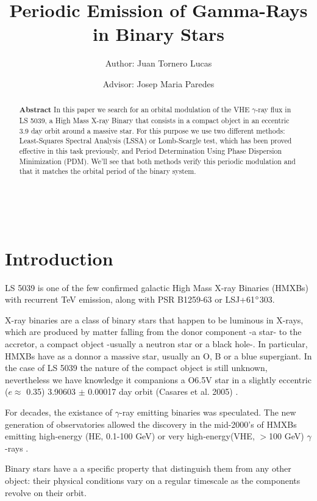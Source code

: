 \documentclass[twocolumn]{revtex4}
\begin{document}
\title{Periodic Emission of Gamma-Rays in Binary Stars}
\author{Author: Juan Tornero Lucas}\\
\author{Advisor: Josep Maria Paredes}
\begin{abstract}
\textbf{Abstract }In this paper we search for an orbital modulation of the VHE $\gamma$-ray flux in LS 5039, a High Mass X-ray Binary that consists in a compact object in an eccentric 3.9 day orbit around a massive star. For this purpose we use two different methods: Least-Squares Spectral Analysis (LSSA) or Lomb-Scargle test, which has been proved effective in this task previously, and Period Determination Using Phase Dispersion Minimization (PDM). We'll see that both methods verify this periodic modulation and that it matches the orbital period of the binary system.
\end{abstract}

\maketitle

\section{Introduction}


LS 5039 is one of the few confirmed galactic High Mass X-ray Binaries (HMXBs) with recurrent TeV emission, along with PSR B1259-63 or LSJ+61$\degree$303. 

X-ray binaries are a class of binary stars that happen to be luminous in X-rays, which are produced by matter falling from the donor component -a star- to the accretor, a compact object -usually a neutron star or a black hole-. In particular, HMXBs have as a donnor a massive star, usually an O, B or a blue supergiant. In the case of LS 5039 the nature of the compact object is still unknown, nevertheless we have knowledge it companions a O6.5V star in a slightly eccentric ($e \approx $ 0.35) 3.90603 $\pm$ 0.00017 day orbit (Casares et al. 2005) \cite{casares}.

For decades, the existance of $\gamma$-ray emitting binaries was speculated. The new generation of observatories allowed the discovery in the mid-2000's of HMXBs emitting high-energy (HE, 0.1-100 GeV) or very high-energy(VHE, $>$100 GeV) $\gamma$-rays \cite{dubus}. 

Binary stars have a a specific property that distinguish them from any other object: their physical conditions vary on a regular timescale as the components revolve on their orbit. 
\end{document}
